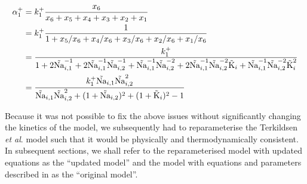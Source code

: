 \documentclass[fleqn,10pt]{physiome}
\begin{document}
\begin{align}
	\alpha_1^+ &= k_1^+ \frac{x_6}{x_6 + x_5 + x_4 + x_3 + x_2 + x_1} \notag \\
	&= k_1^+ \frac{1}{1 + x_5/x_6 + x_4/x_6 + x_3/x_6 + x_2/x_6 + x_1/x_6} \notag  \\
	&= \frac{k_1^+}{1 + 2\tilde{\text{Na}}_{i,1}^{-1} + 2\tilde{\text{Na}}_{i,1}^{-1}\tilde{\text{Na}}_{i,2}^{-1} + \tilde{\text{Na}}_{i,1}^{-1}\tilde{\text{Na}}_{i,2}^{-2} + 2\tilde{\text{Na}}_{i,1}^{-1}\tilde{\text{Na}}_{i,2}^{-2}\tilde{\text{K}}_i + \tilde{\text{Na}}_{i,1}^{-1}\tilde{\text{Na}}_{i,2}^{-2}\tilde{\text{K}}_i^2} \notag  \\
	&= \frac{k_1^+  \tilde{\text{Na}}_{i,1}\tilde{\text{Na}}_{i,2}^2}{\tilde{\text{Na}}_{i,1}\tilde{\text{Na}}_{i,2}^2 + (1 + \tilde{\text{Na}}_{i,2})^2 + (1 + \tilde{\text{K}}_i)^2 -1}
\end{align}

Because it was not possible to fix the above issues without significantly changing the kinetics of the model, we subsequently had to reparameterise the Terkildsen \textit{et al}. model such that it would be physically and thermodynamically consistent. In subsequent sections, we shall refer to the reparameterised model with updated equations as the ``updated model'' and the model with equations and parameters described in \citet{terkildsen_balance_2007} as the ``original model''.
\end{document}
